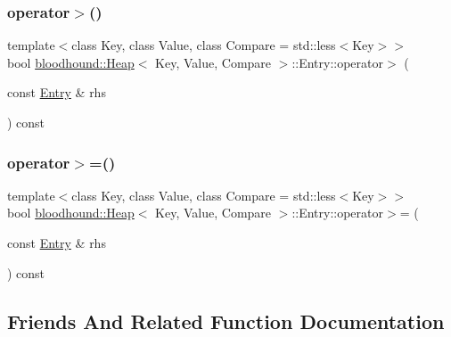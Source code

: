 \subsubsection{\texorpdfstring{operator$>$()}{operator>()}}
{\footnotesize\ttfamily template$<$class Key, class Value, class Compare = std\+::less$<$\+Key$>$$>$ \\
bool \hyperlink{classbloodhound_1_1Heap}{bloodhound\+::\+Heap}$<$ Key, Value, Compare $>$\+::Entry\+::operator$>$ (\begin{DoxyParamCaption}\item[{const \hyperlink{structbloodhound_1_1Heap_1_1Entry}{Entry} \&}]{rhs }\end{DoxyParamCaption}) const\hspace{0.3cm}{\ttfamily [inline]}}

\mbox{\label{structbloodhound_1_1Heap_1_1Entry_ae6c13b04614fc5bc287577d83a524831}} 
\subsubsection{\texorpdfstring{operator$>$=()}{operator>=()}}
{\footnotesize\ttfamily template$<$class Key, class Value, class Compare = std\+::less$<$\+Key$>$$>$ \\
bool \hyperlink{classbloodhound_1_1Heap}{bloodhound\+::\+Heap}$<$ Key, Value, Compare $>$\+::Entry\+::operator$>$= (\begin{DoxyParamCaption}\item[{const \hyperlink{structbloodhound_1_1Heap_1_1Entry}{Entry} \&}]{rhs }\end{DoxyParamCaption}) const\hspace{0.3cm}{\ttfamily [inline]}}



\subsection{Friends And Related Function Documentation}
\mbox{\label{structbloodhound_1_1Heap_1_1Entry_a885f1645de32df3dbfbf9f2f47f7ea1f}} 
